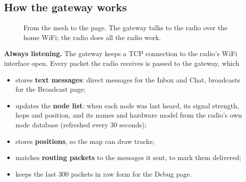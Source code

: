 \documentclass[10pt,a4paper]{article}
\newcommand{\lead}[1]{\textbf{#1}\enspace}           %
\begin{document}
\subsection{How the gateway works}
\begin{figure}[H]\centering
{}
\caption{From the mesh to the page. The gateway talks to the radio over the home WiFi; the radio does all the radio work.}
\end{figure}

\lead{Always listening.} The gateway keeps a TCP connection to the radio's WiFi interface open. Every packet the radio receives is passed to the gateway, which
\begin{itemize}[leftmargin=1.2em]
\item stores \textbf{text messages}: direct messages for the Inbox and Chat, broadcasts for the Broadcast page;
\item updates the \textbf{node list}: when each node was last heard, its signal strength, hops and position, and its names and hardware model from the radio's own node database (refreshed every 30 seconds);
\item stores \textbf{positions}, so the map can draw tracks;
\item matches \textbf{routing packets} to the messages it sent, to mark them delivered;
\item keeps the last 300 packets in raw form for the Debug page.
\end{itemize}
\end{document}
